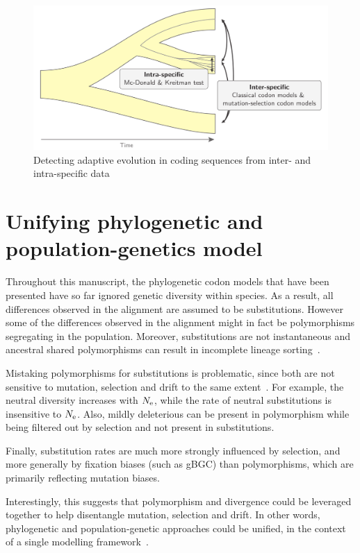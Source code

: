 \begin{figure}[htbp]
    \centering
    \includegraphics[width=\textwidth] {figures/inter-intra}
    \caption{Detecting adaptive evolution in coding sequences from inter- and intra-specific data}
    \label{fig:detecting-adaptation-inter-intra}
\end{figure}

\section{Unifying phylogenetic and population-genetics model}
\label{sec:unifying-phylogenetic-and-population-genetics-model}

Throughout this manuscript, the phylogenetic codon models that have been presented have so far ignored genetic diversity within species.
As a result, all differences observed in the alignment are assumed to be substitutions.
However some of the differences observed in the alignment might in fact be polymorphisms segregating in the population.
Moreover, substitutions are not instantaneous and ancestral shared polymorphisms can result in incomplete lineage sorting~\citep{Charlesworth2010}.

Mistaking polymorphisms for substitutions is problematic, since both are not sensitive to mutation, selection and drift to the same extent~\citep{Mugal2014}.
For example, the neutral diversity increases with $N_{\text{e}}$, while the rate of neutral substitutions is insensitive to $N_{\text{e}}$.
Also, mildly deleterious can be present in polymorphism while being filtered out by selection and not present in substitutions.

Finally, substitution rates are much more strongly influenced by selection, and more generally by fixation biases (such as gBGC) than polymorphisms, which are primarily reflecting mutation biases.

Interestingly, this suggests that polymorphism and divergence could be leveraged together to help disentangle mutation, selection and drift.
In other words, phylogenetic and population-genetic approaches could be unified, in the context of a single modelling framework~\citep{Thorne2012}.


